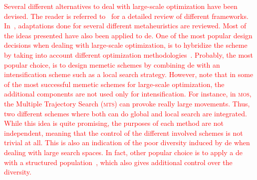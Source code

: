 \documentclass[review,3p]{elsarticle}
\newcommand{\DE}{{\sc de}}
\begin{document}
\textcolor{red}{
Several different alternatives to deal with large-scale optimization have been devised.
%
The reader is referred to~\cite{Mahdavi:14} for a detailed review of different frameworks.
%
In~\cite{Mahdavi:14}, adaptations done for several different metaheuristics are reviewed.
%
Most of the ideas presented have also been applied to \DE{}.
%
One of the most popular design decisions when dealing with large-scale optimization, 
is to hybridize the scheme by taking into account different optimization methodologies~\cite{Piotrowski:13}.
%
Probably, the most popular choice, is to design memetic schemes by combining \DE{} with an intensification scheme such as a local search strategy.
%
However, note that in some of the most successful memetic schemes for large-scale optimization,
the additional components are not used only for intensification.
%
For instance, in \textsc{mos}, the Multiple Trajectory Search (\textsc{mts}) can provoke really large movements.
%
Thus, two different schemes where both can do global and local search are integrated.
%
While this idea is quite promising, the purposes of each method are not independent, meaning that the control of the different involved schemes 
is not trivial at all. 
%
This is also an indication of the poor diversity induced by \DE{} when dealing with large search spaces.
%
In fact, other popular choice is to apply a \DE{} with a structured population~\cite{Weber:11}, 
which also gives additional control over the diversity.
}
\end{document}
